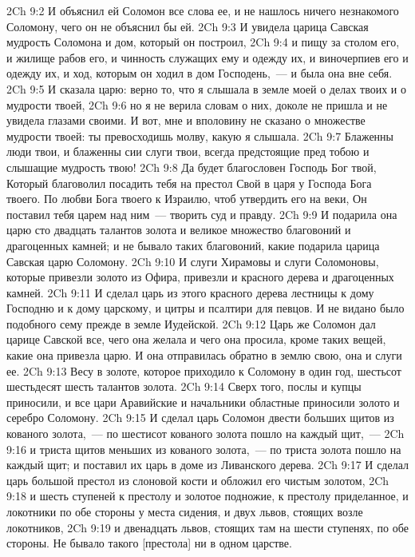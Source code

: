 \vs 2Ch 9:2 И объяснил ей Соломон все слова ее, и не нашлось ничего незнакомого Соломону, чего он не объяснил бы ей.
\vs 2Ch 9:3 И увидела царица Савская мудрость Соломона и дом, который он построил,
\vs 2Ch 9:4 и пищу за столом его, и жилище рабов его, и чинность служащих ему и одежду их, и виночерпиев его и одежду их, и ход, которым он ходил в дом Господень,~--- и была она вне себя.
\vs 2Ch 9:5 И сказала царю: верно то, что я слышала в земле моей о делах твоих и о мудрости твоей,
\vs 2Ch 9:6 но я не верила словам о них, доколе не пришла и не увидела глазами своими. И вот, мне и вполовину не сказано о множестве мудрости твоей: ты превосходишь молву, какую я слышала.
\vs 2Ch 9:7 Блаженны люди твои, и блаженны сии слуги твои, всегда предстоящие пред тобою и слышащие мудрость твою!
\vs 2Ch 9:8 Да будет благословен Господь Бог твой, Который благоволил посадить тебя на престол Свой в царя у Господа Бога твоего. По любви Бога твоего к Израилю, чтоб утвердить его на веки, Он поставил тебя царем над ним~--- творить суд и правду.
\vs 2Ch 9:9 И подарила она царю сто двадцать талантов золота и великое множество благовоний и драгоценных камней; и не бывало таких благовоний, какие подарила царица Савская царю Соломону.
\vs 2Ch 9:10 И слуги Хирамовы и слуги Соломоновы, которые привезли золото из Офира, привезли и красного дерева и драгоценных камней.
\vs 2Ch 9:11 И сделал царь из этого красного дерева лестницы к дому Господню и к дому царскому, и цитры и псалтири для певцов. И не видано было подобного сему прежде в земле Иудейской.
\vs 2Ch 9:12 Царь же Соломон дал царице Савской все, чего она желала и чего она просила, кроме таких вещей, какие она привезла царю. И она отправилась обратно в землю свою, она и слуги ее.
\rsbpar\vs 2Ch 9:13 Весу в золоте, которое приходило к Соломону в один год,  шестьсот шестьдесят шесть талантов золота.
\vs 2Ch 9:14 Сверх того, послы и купцы приносили, и все цари Аравийские и начальники областные приносили золото и серебро Соломону.
\vs 2Ch 9:15 И сделал царь Соломон двести больших щитов из кованого золота,~--- по шестисот  кованого золота пошло на каждый щит,~---
\vs 2Ch 9:16 и триста щитов меньших из кованого золота,~--- по триста  золота пошло на каждый щит; и поставил их царь в доме из Ливанского дерева.
\vs 2Ch 9:17 И сделал царь большой престол из слоновой кости и обложил его чистым золотом,
\vs 2Ch 9:18 и шесть ступеней к престолу и золотое подножие, к престолу приделанное, и локотники по обе стороны у места сидения, и двух львов, стоящих возле локотников,
\vs 2Ch 9:19 и  двенадцать львов, стоящих там на шести ступенях, по обе стороны. Не бывало такого [престола] ни в одном царстве.
